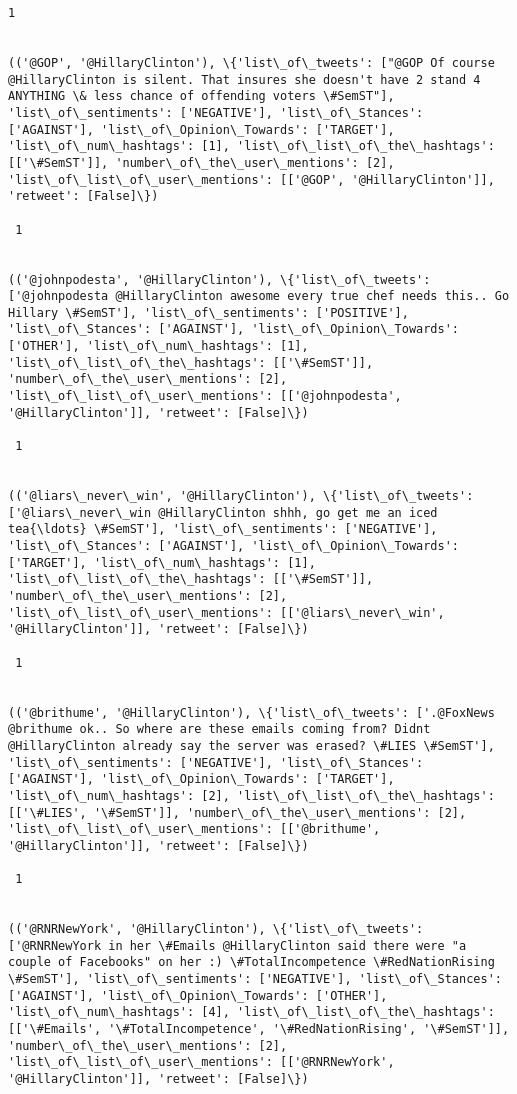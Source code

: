 \documentclass[11pt]{article}
\begin{document}
\begin{Verbatim}[commandchars=\\\{\}]
 1
 

(('@GOP', '@HillaryClinton'), \{'list\_of\_tweets': ["@GOP Of course @HillaryClinton is silent. That insures she doesn't have 2 stand 4 ANYTHING \& less chance of offending voters \#SemST"], 'list\_of\_sentiments': ['NEGATIVE'], 'list\_of\_Stances': ['AGAINST'], 'list\_of\_Opinion\_Towards': ['TARGET'], 'list\_of\_num\_hashtags': [1], 'list\_of\_list\_of\_the\_hashtags': [['\#SemST']], 'number\_of\_the\_user\_mentions': [2], 'list\_of\_list\_of\_user\_mentions': [['@GOP', '@HillaryClinton']], 'retweet': [False]\})

 1
 

(('@johnpodesta', '@HillaryClinton'), \{'list\_of\_tweets': ['@johnpodesta @HillaryClinton awesome every true chef needs this.. Go Hillary \#SemST'], 'list\_of\_sentiments': ['POSITIVE'], 'list\_of\_Stances': ['AGAINST'], 'list\_of\_Opinion\_Towards': ['OTHER'], 'list\_of\_num\_hashtags': [1], 'list\_of\_list\_of\_the\_hashtags': [['\#SemST']], 'number\_of\_the\_user\_mentions': [2], 'list\_of\_list\_of\_user\_mentions': [['@johnpodesta', '@HillaryClinton']], 'retweet': [False]\})

 1
 

(('@liars\_never\_win', '@HillaryClinton'), \{'list\_of\_tweets': ['@liars\_never\_win @HillaryClinton shhh, go get me an iced tea{\ldots} \#SemST'], 'list\_of\_sentiments': ['NEGATIVE'], 'list\_of\_Stances': ['AGAINST'], 'list\_of\_Opinion\_Towards': ['TARGET'], 'list\_of\_num\_hashtags': [1], 'list\_of\_list\_of\_the\_hashtags': [['\#SemST']], 'number\_of\_the\_user\_mentions': [2], 'list\_of\_list\_of\_user\_mentions': [['@liars\_never\_win', '@HillaryClinton']], 'retweet': [False]\})

 1
 

(('@brithume', '@HillaryClinton'), \{'list\_of\_tweets': ['.@FoxNews @brithume ok.. So where are these emails coming from? Didnt @HillaryClinton already say the server was erased? \#LIES \#SemST'], 'list\_of\_sentiments': ['NEGATIVE'], 'list\_of\_Stances': ['AGAINST'], 'list\_of\_Opinion\_Towards': ['TARGET'], 'list\_of\_num\_hashtags': [2], 'list\_of\_list\_of\_the\_hashtags': [['\#LIES', '\#SemST']], 'number\_of\_the\_user\_mentions': [2], 'list\_of\_list\_of\_user\_mentions': [['@brithume', '@HillaryClinton']], 'retweet': [False]\})

 1
 

(('@RNRNewYork', '@HillaryClinton'), \{'list\_of\_tweets': ['@RNRNewYork in her \#Emails @HillaryClinton said there were "a couple of Facebooks" on her :) \#TotalIncompetence \#RedNationRising \#SemST'], 'list\_of\_sentiments': ['NEGATIVE'], 'list\_of\_Stances': ['AGAINST'], 'list\_of\_Opinion\_Towards': ['OTHER'], 'list\_of\_num\_hashtags': [4], 'list\_of\_list\_of\_the\_hashtags': [['\#Emails', '\#TotalIncompetence', '\#RedNationRising', '\#SemST']], 'number\_of\_the\_user\_mentions': [2], 'list\_of\_list\_of\_user\_mentions': [['@RNRNewYork', '@HillaryClinton']], 'retweet': [False]\})


\end{Verbatim}
\end{document}
